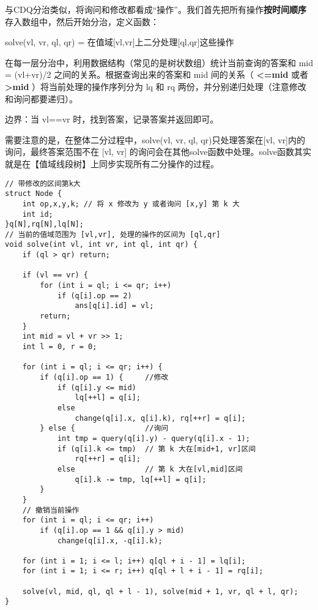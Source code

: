 \par \noindent 与CDQ分治类似，将询问和修改都看成“操作”。我们首先把所有操作\textbf{按时间顺序}存入数组中，然后开始分治，定义函数：
\begin{tcolorbox}
\par solve(vl, vr, ql, qr) = 在值域[vl,vr]上二分处理[ql,qr]这些操作
\end{tcolorbox}
\par \noindent 在每一层分治中，利用数据结构（常见的是树状数组）统计当前查询的答案和 mid = (vl+vr)/2 之间的关系。根据查询出来的答案和 mid 间的关系（ \textbf{<=mid} 或者 \textbf{>mid} ）将当前处理的操作序列分为 lq 和 rq 两份，并分别递归处理（注意修改和询问都要递归）。
~\\
\par \noindent 边界：当 vl==vr 时，找到答案，记录答案并返回即可。
~\\
\par \noindent 需要注意的是，在整体二分过程中，solve(vl, vr, ql, qr)只处理答案在[vl, vr]内的询问，最终答案范围不在 [vl, vr] 的询问会在其他solve函数中处理。solve函数其实就是在【值域线段树】上同步实现所有二分操作的过程。
\begin{verbatim}
// 带修改的区间第k大
struct Node {
    int op,x,y,k; // 将 x 修改为 y 或者询问 [x,y] 第 k 大
    int id;
}q[N],rq[N],lq[N];
// 当前的值域范围为 [vl,vr], 处理的操作的区间为 [ql,qr]
void solve(int vl, int vr, int ql, int qr) {
    if (ql > qr) return;

    if (vl == vr) {
        for (int i = ql; i <= qr; i++)
            if (q[i].op == 2)
                ans[q[i].id] = vl;
        return;
    }
    int mid = vl + vr >> 1;
    int l = 0, r = 0;

    for (int i = ql; i <= qr; i++) {
        if (q[i].op == 1) {     //修改
            if (q[i].y <= mid)
                lq[++l] = q[i];
            else
                change(q[i].x, q[i].k), rq[++r] = q[i];
        } else {                //询问
            int tmp = query(q[i].y) - query(q[i].x - 1);
            if (q[i].k <= tmp)  // 第 k 大在[mid+1, vr]区间
                rq[++r] = q[i];
            else                // 第 k 大在[vl,mid]区间
                q[i].k -= tmp, lq[++l] = q[i];
        }
    }
    // 撤销当前操作
    for (int i = ql; i <= qr; i++)
        if (q[i].op == 1 && q[i].y > mid)
            change(q[i].x, -q[i].k);

    for (int i = 1; i <= l; i++) q[ql + i - 1] = lq[i];
    for (int i = 1; i <= r; i++) q[ql + l + i - 1] = rq[i];

    solve(vl, mid, ql, ql + l - 1), solve(mid + 1, vr, ql + l, qr);
}
\end{verbatim}